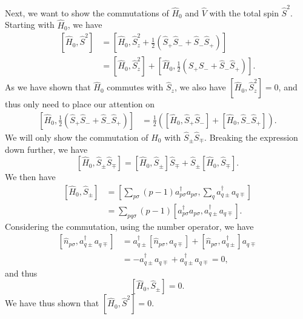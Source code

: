 Next, we want to show the commutations of $\hat{H}_0$ and $\hat{V}$ with the total spin $\hat{S}^2$.
Starting with $\hat{H}_0$, we have
\begin{align*}
    \left[ \hat{H}_0, \hat{S}^2 \right]
    &= \left[
        \hat{H}_0,
        \hat{S}_z^2 + \frac{1}{2}(\hat{S}_+ \hat{S}_- + \hat{S}_- \hat{S}_+)
    \right] \\
    &= \left[ \hat{H}_0, \hat{S}_z^2 \right] + \left[ \hat{H}_0, \frac{1}{2}(\hat{S}_+ \hat{S}_- + \hat{S}_- \hat{S}_+) \right].
\end{align*}
As we have shown that $\hat{H}_0$ commutes with $\hat{S}_z$, we also have $\left[ \hat{H}_0, \hat{S}_z^2 \right] = 0$, and thus only need to place our attention on
\begin{align*}
    \left[ \hat{H}_0, \frac{1}{2}(\hat{S}_+ \hat{S}_- + \hat{S}_- \hat{S}_+) \right]
    &= \frac{1}{2} \left(
        \left[
            \hat{H}_0, \hat{S}_+ \hat{S}_-
        \right]
        + \left[
            \hat{H}_0, \hat{S}_- \hat{S}_+
        \right]
    \right).
\end{align*}
We will only show the commutation of $\hat{H}_0$ with $\hat{S}_{\pm} \hat{S}_{\mp}$.
Breaking the expression down further, we have
\begin{equation*}
    \left[ \hat{H}_0, \hat{S}_\pm \hat{S}_\mp \right]
    = \left[ \hat{H}_0, \hat{S}_\pm \right] \hat{S}_\mp + \hat{S}_\pm \left[ \hat{H}_0, \hat{S}_\mp \right].
\end{equation*}
We then have
\begin{align*}
    \left[ \hat{H}_0, \hat{S}_{\pm} \right]
    &= \left[
        \sum_{p\sigma} (p-1) a_{p\sigma}^{\dagger} a_{p\sigma},
        \sum_{q} a^\dag_{q\pm} a_{q\mp}
    \right] \\
    &= \sum_{pq \sigma} (p-1) \left[
        a_{p\sigma}^{\dagger} a_{p\sigma},
        a^\dag_{q\pm} a_{q\mp}
    \right].
\end{align*}
Considering the commutation, using the number operator, we have
\begin{align*}
    \left[ \hat{n}_{p\sigma}, a^\dag_{q\pm} a_{q\mp} \right]
    &= a^\dag_{q\pm} \left[ \hat{n}_{p\sigma}, a_{q\mp} \right] + \left[ \hat{n}_{p\sigma}, a^\dag_{q\pm} \right] a_{q\mp} \\
    &= - a^\dag_{q\pm} a_{q\mp} + a^\dag_{q\pm} a_{q\mp} = 0,
\end{align*}
and thus
\begin{equation*}
    \left[ \hat{H}_0, \hat{S}_{\pm} \right] = 0.
\end{equation*}
We have thus shown that $\left[ \hat{H}_0, \hat{S}^2 \right] = 0$.

